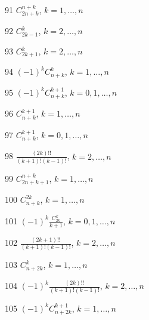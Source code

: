 \documentclass[11pt, russian]{article}
\begin{document}
91 
$C_{2n+k}^{n+k}$, $k=1,\ldots,n$\par\vspace{5mm}

92 
$C_{2k-1}^{k}$, $k=2,\ldots,n$\par\vspace{5mm}

93 
$C_{2k+1}^{k}$, $k=2,\ldots,n$\par\vspace{5mm}

94 
$(-1)^{k}C_{n+k}^{k}$, $k=1,\ldots,n$\par\vspace{5mm}

95 
$(-1)^{k}C_{n+k}^{k+1}$, $k=0,1,\ldots,n$\par\vspace{5mm}

96 
$C_{n+k}^{k+1}$, $k=1,\ldots,n$\par\vspace{5mm}

97 
$C_{n+k}^{k+1}$, $k=0,1,\ldots,n$\par\vspace{5mm}

98 
$\frac{(2k)!!}{(k+1)!(k-1)!}$, $k=2,\ldots,n$\par\vspace{5mm}

99 
$C_{2n+k+1}^{n+k}$, $k=1,\ldots,n$\par\vspace{5mm}

100 
$C_{n+k}^{2k}$, $k=1,\ldots,n$\par\vspace{5mm}

101 
$(-1)^{k}\frac{C_{2k}^k}{k+1}$, $k=0,1,\ldots,n$\par\vspace{5mm}

102 
$\frac{(2k+1)!!}{(k+1)!(k-1)!}$, $k=2,\ldots,n$\par\vspace{5mm}

103 
$C_{n+2k}^{k}$, $k=1,\ldots,n$\par\vspace{5mm}

104 
$(-1)^{k}\frac{(2k)!!}{(k+1)!(k-1)!}$, $k=2,\ldots,n$\par\vspace{5mm}

105 
$(-1)^{k}C_{n+2k}^{k+1}$, $k=1,\ldots,n$\par\vspace{5mm}
\end{document}
